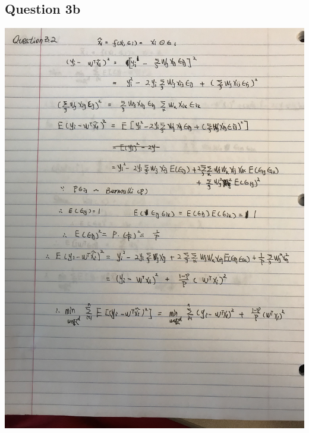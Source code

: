\documentclass[11pt]{article} %
\begin{document}
\subsection{Question 3b}
\includegraphics[scale = 0.15]{e32.jpeg}\\
\end{document}
